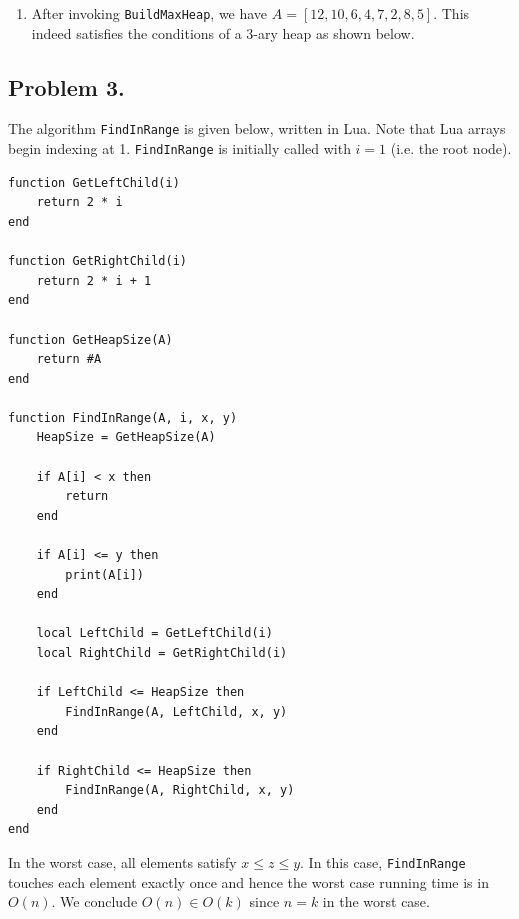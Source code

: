\documentclass[11pt, letterpaper, titlepage]{article}
\begin{document}
\begin{enumerate}[label=\alph*)]
    \item After invoking \texttt{BuildMaxHeap}, we have $A = [12, 10, 6, 4, 7, 2, 8, 5]$. This indeed satisfies the conditions of a 3-ary heap as shown below.
    \begin{figure}[H]
    \centering
    \end{figure}
    
\end{enumerate}

\newpage
\subsection*{Problem 3.}
The algorithm \texttt{FindInRange} is given below, written in Lua. Note that Lua arrays begin indexing at 1. \texttt{FindInRange} is initially called with $i = 1$ (i.e. the root node).
\begin{verbatim}
function GetLeftChild(i)
    return 2 * i
end

function GetRightChild(i)
    return 2 * i + 1
end

function GetHeapSize(A)
    return #A
end

function FindInRange(A, i, x, y)
    HeapSize = GetHeapSize(A)
    
    if A[i] < x then
        return
    end
    
    if A[i] <= y then
        print(A[i])
    end
    
    local LeftChild = GetLeftChild(i)
    local RightChild = GetRightChild(i)
    
    if LeftChild <= HeapSize then
        FindInRange(A, LeftChild, x, y)
    end
    
    if RightChild <= HeapSize then
        FindInRange(A, RightChild, x, y)
    end
end
\end{verbatim}
In the worst case, all elements satisfy $x \leq z \leq y$. In this case, \texttt{FindInRange} touches each element exactly once and hence the worst case running time is in $O(n)$. We conclude $O(n) \in O(k)$ since $n = k$ in the worst case.
\end{document}
